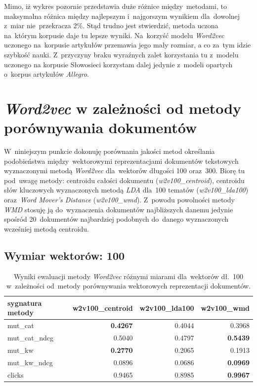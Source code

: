 \documentclass[pl]{minipw} %
\begin{document}
Mimo, iż wykres pozornie przedstawia duże różnice między~metodami, to maksymalna różnica między najlepszym i~najgorszym wynikiem dla~dowolnej z~miar nie~przekracza 2\%. Stąd trudno jest stwierdzić, metoda uczona na~którym korpusie daje tu lepsze wyniki. Na~korzyść modelu \textit{Word2vec} uczonego na~korpusie artykułów przemawia jego mały rozmiar, a co za~tym idzie szybkość nauki. Z~przyczyny braku wyraźnych zalet korzystania tu z~modelu uczonego na korpusie Słowosieci korzystam dalej jedynie z~modeli opartych o~korpus artykułów \textit{Allegro}.

\section{\textit{Word2vec} w zależności od metody porównywania dokumentów}

W~niniejszym punkcie dokonuję porównania jakości metod określania podobieństwa między~wektorowymi reprezentacjami dokumentów tekstowych wyznaczonymi metodą \textit{Word2vec} dla~wektorów długości 100 oraz~300. Biorę tu pod~uwagę metody: centroidu całości dokumentu (\textit{w2v100\_centroid}), centroidu słów kluczowych wyznaczonych metodą \textit{LDA} dla~100 tematów (\textit{w2v100\_lda100}) oraz~\textit{Word Mover's Distance} (\textit{w2v100\_wmd}). Z~powodu powolności metody \textit{WMD} stosuję ją do~wyznaczenia dokumentów najbliższych danemu jedynie spośród 20~dokumentów najbardziej podobnych do~danego wyznaczonych wcześniej metodą centroidu.

\subsection{Wymiar wektorów: 100}

\begin{table}[H]
	\centering
	\begin{tabular}{lrrr}
		\hline
		sygnatura metody &   w2v100\_centroid &   w2v100\_lda100 &   w2v100\_wmd \\
		\hline
		mut\_cat      &            \textbf{0.4267} &          0.4044 &       0.3968 \\
		mut\_cat\_ndcg &            0.5040  &          0.4797 &       \textbf{0.5439} \\
		mut\_kw       &            \textbf{0.2770}  &          0.2065 &       0.1913 \\
		mut\_kw\_ndcg  &            0.0896 &          0.0686 &       \textbf{0.0969} \\
		clicks       &            0.9465 &          0.8985 &       \textbf{0.9967} \\
		\hline
	\end{tabular}
	\caption{Wyniki ewaluacji metody \textit{Word2vec} różnymi miarami dla~wektorów dł.~100 w~zależności od~metody porównywania wektorowych reprezentacji dokumentów.}
\end{table}
\end{document}
